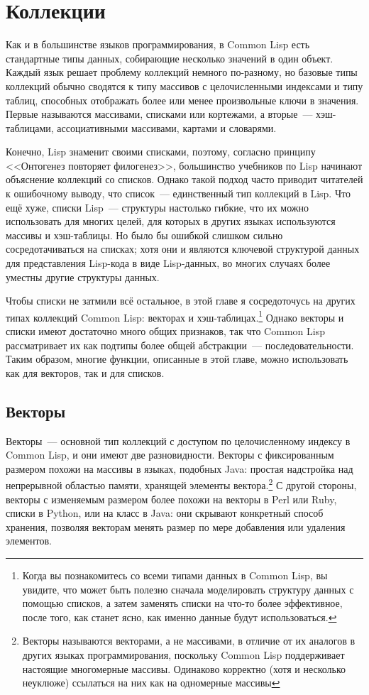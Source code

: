 \chapter{Коллекции}
\label{ch:11}

Как и в большинстве языков программирования, в Common Lisp есть стандартные типы данных,
собирающие несколько значений в один объект.  Каждый язык решает проблему коллекций
немного по-разному, но базовые типы коллекций обычно сводятся к типу массивов с целочисленными
индексами и типу таблиц, способных отображать более или менее
произвольные ключи в значения.  Первые называются массивами, списками или кортежами, а
вторые~--- хэш-таблицами, ассоциативными массивами, картами и словарями.

Конечно, Lisp знаменит своими списками, поэтому, согласно принципу <<Онтогенез повторяет
филогенез>>, большинство учебников по Lisp начинают объяснение коллекций со
списков. Однако такой подход часто приводит читателей к ошибочному выводу, что
список~--- единственный тип коллекций в Lisp.  Что ещё хуже,
списки Lisp~--- структуры настолько гибкие, что их можно использовать для многих целей, для
которых в других языках используются массивы и хэш-таблицы.  Но было бы ошибкой слишком
сильно сосредотачиваться на списках; хотя они и являются ключевой структурой данных для
представления Lisp-кода в виде Lisp-данных, во многих случаях более уместны другие структуры данных.

Чтобы списки не затмили всё остальное, в этой главе я сосредоточусь на других типах
коллекций Common Lisp: векторах и хэш-таблицах.\footnote{Когда вы познакомитесь со всеми
  типами данных в Common Lisp, вы увидите, что может быть полезно сначала моделировать
  структуру данных с помощью списков, а затем заменять списки на что-то более 
  эффективное, после того, как станет ясно, как именно данные будут использоваться.}
Однако векторы и списки имеют достаточно много общих признаков, так что Common Lisp
рассматривает их как подтипы более общей абстракции~--- последовательности.  Таким образом,
многие функции, описанные в этой главе, можно использовать как для векторов, так и для
списков.

\section{Векторы}

Векторы~--- основной тип коллекций с доступом по целочисленному индексу в Common Lisp, и они
имеют две разновидности.  Векторы с фиксированным размером похожи на массивы в языках,
подобных Java: простая надстройка над непрерывной областью памяти, хранящей элементы
вектора.\footnote{Векторы называются векторами, а не массивами, в отличие от их аналогов в других
  языках программирования, поскольку Common Lisp поддерживает настоящие многомерные
  массивы.  Одинаково корректно (хотя и несколько неуклюже) ссылаться на них как на
  одномерные массивы} С другой стороны, векторы с изменяемым размером более похожи на
векторы в Perl или Ruby, списки в Python, или на класс  в Java: они скрывают
конкретный способ хранения, позволяя векторам менять размер по мере добавления или
удаления элементов.

